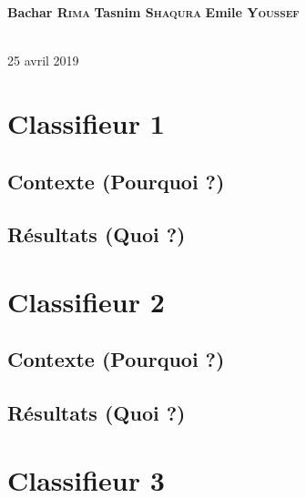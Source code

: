\documentclass[12pt,a4paper]{report}
\begin{document}
\begin{titlepage}
\begin{minipage}{0.4\textwidth}
\centering \Large
\textbf{Bachar \textsc{Rima}} %
\textbf{Tasnim \textsc{Shaqura}} %
\textbf{Emile \textsc{Youssef}} %
\end{minipage} \\[0.8cm]

{\large 25 avril 2019}\\[1cm]
\hspace{\fill}
\vfill %
\end{titlepage}

\tableofcontents

\chapter{Classifieur 1}
\section{Contexte (Pourquoi ?)}
\section{Résultats (Quoi ?)}

\chapter{Classifieur 2}
\section{Contexte (Pourquoi ?)}
\section{Résultats (Quoi ?)}

\chapter{Classifieur 3}
\end{document}
